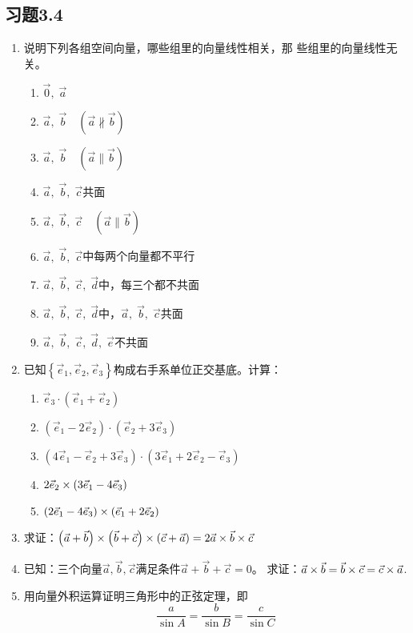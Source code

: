 \subsection*{习题3.4}
\begin{enumerate}
    \item 说明下列各组空间向量，哪些组里的向量线性相关，那
    些组里的向量线性无关。
    \begin{multicols}{2}
\begin{enumerate}
    \item $\vec{0},\; \vec{a}$
    \item $\vec{a},\; \vec{b}\quad (\vec{a}\nparallel\vec{b})$
    \item $\vec{a},\; \vec{b}\quad (\vec{a}\parallel\vec{b})$
    \item $\vec{a},\; \vec{b},\; \vec{c}$共面
    \item $\vec{a},\; \vec{b},\; \vec{c}\quad (\vec{a}\parallel\vec{b})$
    \item $\vec{a},\; \vec{b},\; \vec{c}$中每两个向量都不平行
    \item $\vec{a},\; \vec{b},\; \vec{c},\; \vec{d}$中，每三个都不共面
    \item $\vec{a},\; \vec{b},\; \vec{c},\; \vec{d}$中，$\vec{a},\; \vec{b},\; \vec{c}$共面
    \item $\vec{a},\; \vec{b},\; \vec{c},\; \vec{d},\; \vec{e}$不共面
 \end{enumerate}           
    \end{multicols}

\item 已知$\left\{\vec{e}_1,\vec{e}_2,\vec{e}_3\right\}$构成右手系单位正交基底。计算：
\begin{multicols}{2}
    \begin{enumerate}
\item $\vec{e}_3\cdot \left(\vec{e}_1+\vec{e}_2\right)$
\item $\left(\vec{e}_1-2\vec{e}_2\right)\cdot \left(\vec{e}_2+3\vec{e}_3\right)$
\item $\left(4\vec{e}_1-\vec{e}_2+3\vec{e}_3\right)\cdot \left(3\vec{e}_1+2\vec{e}_2-\vec{e}_3\right)$
\item $2\vec{e}_2\times \left(3\vec{e}_1-4\vec{e}_3\right)$
\item $\left(2\vec{e}_1-4\vec{e}_3\right)\times \left(\vec{e}_1+2\vec{e}_2\right)$
 \end{enumerate}           
    \end{multicols}

\item 求证：$\left(\vec{a}+\vec{b}\right)\times\left(\vec{b}+\vec{c}\right)\times \left(\vec{c}+\vec{a}\right)=2\vec{a}\times \vec{b}\times \vec{c}$
\item 已知：三个向量$\vec{a},\vec{b},\vec{c}$满足条件$\vec{a}+\vec{b}+\vec{c}=0$。
求证：$\vec{a}\times\vec{b}=\vec{b}\times\vec{c}=\vec{c}\times\vec{a}$.
\item 用向量外积运算证明三角形中的正弦定理，即
\[\frac{a}{\sin A}=\frac{b}{\sin B}=\frac{c}{\sin C}\]


\end{enumerate}
